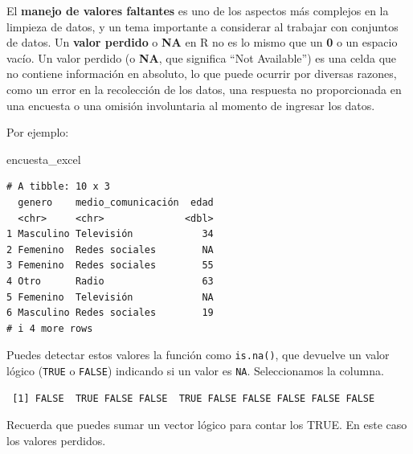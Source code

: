 \documentclass[
  letterpaper,
  DIV=11,
  numbers=noendperiod,
  twoside]{scrreprt}
\newenvironment{Shaded}{\begin{snugshade}}{\end{snugshade}}
\newcommand{\CommentTok}[1]{\textcolor[rgb]{0.37,0.37,0.37}{#1}}
\newcommand{\FunctionTok}[1]{\textcolor[rgb]{0.28,0.35,0.67}{#1}}
\newcommand{\NormalTok}[1]{\textcolor[rgb]{0.00,0.23,0.31}{#1}}
\newcommand{\SpecialCharTok}[1]{\textcolor[rgb]{0.37,0.37,0.37}{#1}}
\begin{document}
El \textbf{manejo de valores faltantes} es uno de los aspectos más
complejos en la limpieza de datos, y un tema importante a considerar al
trabajar con conjuntos de datos. Un \textbf{valor perdido} o \textbf{NA}
en R no es lo mismo que un \textbf{0} o un espacio vacío. Un valor
perdido (o \textbf{NA}, que significa ``Not Available'') es una celda
que no contiene información en absoluto, lo que puede ocurrir por
diversas razones, como un error en la recolección de los datos, una
respuesta no proporcionada en una encuesta o una omisión involuntaria al
momento de ingresar los datos.

Por ejemplo:

\begin{Shaded}
\begin{Highlighting}[]
\NormalTok{encuesta\_excel}
\end{Highlighting}
\end{Shaded}

\begin{verbatim}
# A tibble: 10 x 3
  genero    medio_comunicación  edad
  <chr>     <chr>              <dbl>
1 Masculino Televisión            34
2 Femenino  Redes sociales        NA
3 Femenino  Redes sociales        55
4 Otro      Radio                 63
5 Femenino  Televisión            NA
6 Masculino Redes sociales        19
# i 4 more rows
\end{verbatim}

Puedes detectar estos valores la función como \texttt{is.na()}, que
devuelve un valor lógico (\texttt{TRUE} o \texttt{FALSE}) indicando si
un valor es \texttt{NA}. Seleccionamos la columna.

\begin{Shaded}
\end{Shaded}

\begin{verbatim}
 [1] FALSE  TRUE FALSE FALSE  TRUE FALSE FALSE FALSE FALSE FALSE
\end{verbatim}

Recuerda que puedes sumar un vector lógico para contar los TRUE. En este
caso los valores perdidos.

\begin{Shaded}
\end{Shaded}
\end{document}
